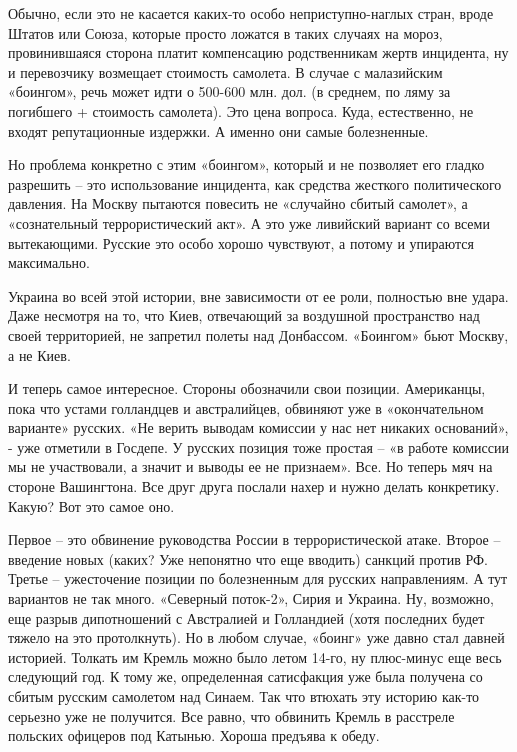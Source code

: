 Обычно, если это не касается каких-то особо неприступно-наглых стран, вроде
Штатов или Союза, которые просто ложатся в таких случаях на мороз,
провинившаяся сторона платит компенсацию родственникам жертв инцидента, ну и
перевозчику возмещает стоимость самолета. В случае с малазийским «боингом»,
речь может идти о 500-600 млн. дол. (в среднем, по ляму за погибшего +
стоимость самолета). Это цена вопроса. Куда, естественно, не входят
репутационные издержки. А именно они самые болезненные.

Но проблема конкретно с этим «боингом», который и не позволяет его гладко
разрешить – это использование инцидента, как средства жесткого политического
давления. На Москву пытаются повесить не «случайно сбитый самолет», а
«сознательный террористический акт». А это уже ливийский вариант со всеми
вытекающими. Русские это особо хорошо чувствуют, а потому и упираются
максимально.

Украина во всей этой истории, вне зависимости от ее роли, полностью вне удара.
Даже несмотря на то, что Киев, отвечающий за воздушной пространство над своей
территорией, не запретил полеты над Донбассом. «Боингом» бьют Москву, а не
Киев.

И теперь самое интересное. Стороны обозначили свои позиции. Американцы, пока
что устами голландцев и австралийцев, обвиняют уже в «окончательном варианте»
русских. «Не верить выводам комиссии у нас нет никаких оснований», - уже
отметили в Госдепе. У русских позиция тоже простая – «в работе комиссии мы не
участвовали, а значит и выводы ее не признаем». Все. Но теперь мяч на стороне
Вашингтона. Все друг друга послали нахер и нужно делать конкретику. Какую? Вот
это самое оно.

Первое – это обвинение руководства России в террористической атаке. Второе –
введение новых (каких? Уже непонятно что еще вводить) санкций против РФ. Третье
– ужесточение позиции по болезненным для русских направлениям. А тут вариантов
не так много. «Северный поток-2», Сирия и Украина. Ну, возможно, еще разрыв
дипотношений с Австралией и Голландией (хотя последних будет тяжело на это
протолкнуть). Но в любом случае, «боинг» уже давно стал давней историей.
Толкать им Кремль можно было летом 14-го, ну плюс-минус еще весь следующий год.
К тому же, определенная сатисфакция уже была получена со сбитым русским
самолетом над Синаем. Так что втюхать эту историю как-то серьезно уже не
получится. Все равно, что обвинить Кремль в расстреле польских офицеров под
Катынью. Хороша предъява к обеду.

